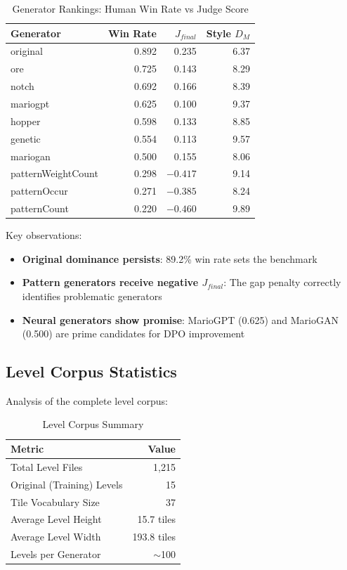 \documentclass[11pt,a4paper]{article}
\theoremstyle{plain}
\theoremstyle{definition}
\theoremstyle{remark}
\begin{document}
\begin{table}[H]
\centering
\caption{Generator Rankings: Human Win Rate vs Judge Score}
\label{tab:generator-rankings}
\begin{tabular}{lrrr}
\toprule
\textbf{Generator} & \textbf{Win Rate} & \textbf{$J_{final}$} & \textbf{Style $D_M$} \\
\midrule
original & 0.892 & 0.235 & 6.37 \\
ore & 0.725 & 0.143 & 8.29 \\
notch & 0.692 & 0.166 & 8.39 \\
mariogpt & 0.625 & 0.100 & 9.37 \\
hopper & 0.598 & 0.133 & 8.85 \\
genetic & 0.554 & 0.113 & 9.57 \\
mariogan & 0.500 & 0.155 & 8.06 \\
patternWeightCount & 0.298 & $-0.417$ & 9.14 \\
patternOccur & 0.271 & $-0.385$ & 8.24 \\
patternCount & 0.220 & $-0.460$ & 9.89 \\
\bottomrule
\end{tabular}
\end{table}

Key observations:
\begin{itemize}
    \item \textbf{Original dominance persists}: 89.2\% win rate sets the benchmark
    \item \textbf{Pattern generators receive negative $J_{final}$}: The gap penalty correctly identifies problematic generators
    \item \textbf{Neural generators show promise}: MarioGPT (0.625) and MarioGAN (0.500) are prime candidates for DPO improvement
\end{itemize}

\subsection{Level Corpus Statistics}
\label{subsec:corpus-stats}

Analysis of the complete level corpus:

\begin{table}[H]
\centering
\caption{Level Corpus Summary}
\label{tab:corpus-summary}
\begin{tabular}{lr}
\toprule
\textbf{Metric} & \textbf{Value} \\
\midrule
Total Level Files & 1,215 \\
Original (Training) Levels & 15 \\
Tile Vocabulary Size & 37 \\
Average Level Height & 15.7 tiles \\
Average Level Width & 193.8 tiles \\
Levels per Generator & $\sim$100 \\
\bottomrule
\end{tabular}
\end{table}
\end{document}
